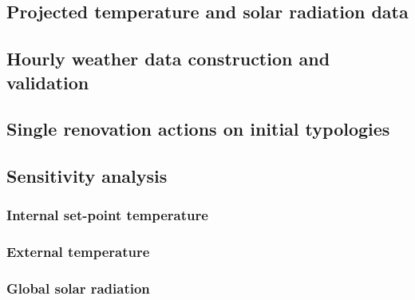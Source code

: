 \documentclass[11pt]{article}
\begin{document}

    \subsection{Projected temperature and solar radiation data} %
    \label{sub:projected_temperature_and_solar_radiation_data}
    

    \subsection{Hourly weather data construction and validation} %
    \label{sub:details_and_justification_of_sin}
    
    

    \subsection{Single renovation actions on initial typologies} %
    \label{sub:single_renovation_actions_on_initial_typologies}
    

    \subsection{Sensitivity analysis} %
    \label{sub:sensitivity_analysis}
        
        \subsubsection{Internal set-point temperature} %
        \label{ssub:internal_set_point_temperature}
        

        \subsubsection{External temperature} %
        \label{ssub:external_temperature}
        

        \subsubsection{Global solar radiation} %
        \label{ssub:global_solar_radiation}
        


\end{document}
